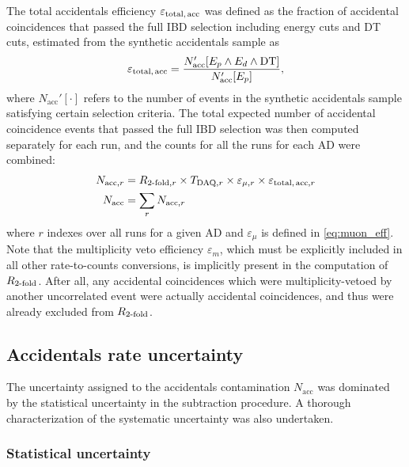 The total accidentals efficiency $\varepsilon_\text{total,\,acc}$
was defined as the fraction of accidental  coincidences
that passed the full IBD selection including energy cuts and DT cuts,
estimated from the synthetic accidentals sample as
\begin{equation}\label{eq:eps_total_acc}
    \varepsilon_{\text{total,\,acc}} =
    \frac{N_\text{acc}'[E_p \wedge E_d \wedge \text{DT}]}{N_\text{acc}'[E_p]},
\end{equation}
where $N_\text{acc}'[\cdot]$ refers to the number of events
in the synthetic accidentals sample satisfying certain selection criteria.
The total expected number of accidental coincidence events
that passed the full IBD selection was then computed
separately for each run, and the counts for all the runs for each AD were combined:
\begin{align}\label{eq:nacc}
    \begin{split}
        N_{\text{acc},r} &= R_{\text{\ensuremath{2}-fold},r}
            \times T_{\text{DAQ},r}\times \varepsilon_{\mu,r}
            \times \varepsilon_{\text{total,\,acc},r}\\
        N_\text{acc} &= \sum_r N_{\text{acc},r}
    \end{split}
\end{align}
where $r$ indexes over all runs for a given AD
and $\varepsilon_\mu$ is defined in \cref{eq:muon_eff}.
Note that the multiplicity veto efficiency $\varepsilon_m$,
which must be explicitly included in all other rate-to-counts conversions,
is implicitly present in the computation of $R_\text{\ensuremath{2}-fold}$.
After all, any accidental coincidences which were multiplicity-vetoed
by another uncorrelated event were actually  accidental coincidences,
and thus were already excluded from $R_\text{\ensuremath{2}-fold}$.

\subsection{Accidentals rate uncertainty}
\label{subsec:acc_err}

The uncertainty assigned to the accidentals contamination $N_\text{acc}$
was dominated by the statistical uncertainty in the subtraction procedure.
A thorough characterization of the systematic uncertainty
was also undertaken.

\subsubsection{Statistical uncertainty}

